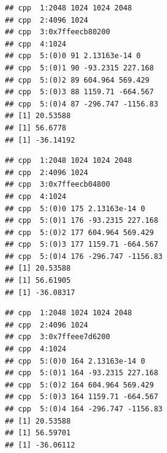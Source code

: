 \documentclass[10pt]{article}\usepackage[]{graphicx}\usepackage[]{color}
\makeatletter
\newenvironment{kframe}{%
 \def\at@end@of@kframe{}%
 \ifinner\ifhmode%
  \def\at@end@of@kframe{\end{minipage}}%
  \begin{minipage}{\columnwidth}%
 \fi\fi%
 \def\FrameCommand##1{\hskip\@totalleftmargin \hskip-\fboxsep
 \colorbox{shadecolor}{##1}\hskip-\fboxsep
     \hskip-\linewidth \hskip-\@totalleftmargin \hskip\columnwidth}%
 \MakeFramed {\advance\hsize-\width
   \@totalleftmargin\z@ \linewidth\hsize
   \@setminipage}}%
 {\par\unskip\endMakeFramed%
 \at@end@of@kframe}
\newenvironment{knitrout}{}{} %
\makeatother
\begin{document}
\begin{knitrout}
\begin{kframe}
{\ttfamily\noindent\itshape\color{messagecolor}{\#\# Stage\ \ 1 est. (Ave. S.V.R. -16.0 dB) \\\#\# f creation}}\begin{verbatim}
## cpp  1:2048 1024 1024 2048
## cpp  2:4096 1024
## cpp  3:0x7ffeecb80200
## cpp  4:1024
## cpp  5:(0)0 91 2.13163e-14 0
## cpp  5:(0)1 90 -93.2315 227.168
## cpp  5:(0)2 89 604.964 569.429
## cpp  5:(0)3 88 1159.71 -664.567
## cpp  5:(0)4 87 -296.747 -1156.83
## [1] 20.53588
## [1] 56.6778
## [1] -36.14192
\end{verbatim}


{\ttfamily\noindent\itshape\color{messagecolor}{\#\# Stage\ \ 2 est. (Ave. S.V.R. -27.2 dB) \\\#\# f creation}}\begin{verbatim}
## cpp  1:2048 1024 1024 2048
## cpp  2:4096 1024
## cpp  3:0x7ffeecb04800
## cpp  4:1024
## cpp  5:(0)0 175 2.13163e-14 0
## cpp  5:(0)1 176 -93.2315 227.168
## cpp  5:(0)2 177 604.964 569.429
## cpp  5:(0)3 177 1159.71 -664.567
## cpp  5:(0)4 176 -296.747 -1156.83
## [1] 20.53588
## [1] 56.61905
## [1] -36.08317
\end{verbatim}


{\ttfamily\noindent\itshape\color{messagecolor}{\#\# Stage\ \ 3 est. (Ave. S.V.R. -41.1 dB) \\\#\# f creation}}\begin{verbatim}
## cpp  1:2048 1024 1024 2048
## cpp  2:4096 1024
## cpp  3:0x7ffeee7d6200
## cpp  4:1024
## cpp  5:(0)0 164 2.13163e-14 0
## cpp  5:(0)1 164 -93.2315 227.168
## cpp  5:(0)2 164 604.964 569.429
## cpp  5:(0)3 164 1159.71 -664.567
## cpp  5:(0)4 164 -296.747 -1156.83
## [1] 20.53588
## [1] 56.59701
## [1] -36.06112
\end{verbatim}



\end{kframe}
\end{knitrout}
\end{document}
